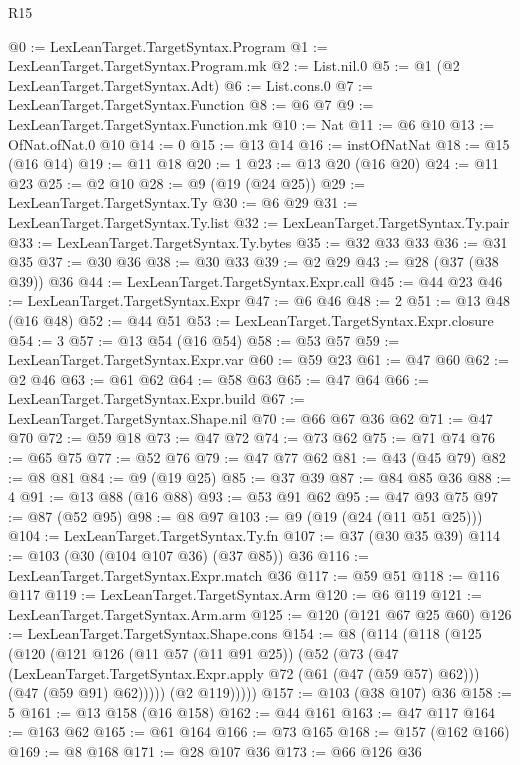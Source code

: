 \begin{lexlean}{R15}
\begin{coremodule}
@0 := LexLeanTarget.TargetSyntax.Program
@1 := LexLeanTarget.TargetSyntax.Program.mk
@2 := List.nil.{0}
@5 := @1 (@2 LexLeanTarget.TargetSyntax.Adt)
@6 := List.cons.{0}
@7 := LexLeanTarget.TargetSyntax.Function
@8 := @6 @7
@9 := LexLeanTarget.TargetSyntax.Function.mk
@10 := Nat
@11 := @6 @10
@13 := OfNat.ofNat.{0} @10
@14 := 0
@15 := @13 @14
@16 := instOfNatNat
@18 := @15 (@16 @14)
@19 := @11 @18
@20 := 1
@23 := @13 @20 (@16 @20)
@24 := @11 @23
@25 := @2 @10
@28 := @9 (@19 (@24 @25))
@29 := LexLeanTarget.TargetSyntax.Ty
@30 := @6 @29
@31 := LexLeanTarget.TargetSyntax.Ty.list
@32 := LexLeanTarget.TargetSyntax.Ty.pair
@33 := LexLeanTarget.TargetSyntax.Ty.bytes
@35 := @32 @33 @33
@36 := @31 @35
@37 := @30 @36
@38 := @30 @33
@39 := @2 @29
@43 := @28 (@37 (@38 @39)) @36
@44 := LexLeanTarget.TargetSyntax.Expr.call
@45 := @44 @23
@46 := LexLeanTarget.TargetSyntax.Expr
@47 := @6 @46
@48 := 2
@51 := @13 @48 (@16 @48)
@52 := @44 @51
@53 := LexLeanTarget.TargetSyntax.Expr.closure
@54 := 3
@57 := @13 @54 (@16 @54)
@58 := @53 @57
@59 := LexLeanTarget.TargetSyntax.Expr.var
@60 := @59 @23
@61 := @47 @60
@62 := @2 @46
@63 := @61 @62
@64 := @58 @63
@65 := @47 @64
@66 := LexLeanTarget.TargetSyntax.Expr.build
@67 := LexLeanTarget.TargetSyntax.Shape.nil
@70 := @66 @67 @36 @62
@71 := @47 @70
@72 := @59 @18
@73 := @47 @72
@74 := @73 @62
@75 := @71 @74
@76 := @65 @75
@77 := @52 @76
@79 := @47 @77 @62
@81 := @43 (@45 @79)
@82 := @8 @81
@84 := @9 (@19 @25)
@85 := @37 @39
@87 := @84 @85 @36
@88 := 4
@91 := @13 @88 (@16 @88)
@93 := @53 @91 @62
@95 := @47 @93 @75
@97 := @87 (@52 @95)
@98 := @8 @97
@103 := @9 (@19 (@24 (@11 @51 @25)))
@104 := LexLeanTarget.TargetSyntax.Ty.fn
@107 := @37 (@30 @35 @39)
@114 := @103 (@30 (@104 @107 @36) (@37 @85)) @36
@116 := LexLeanTarget.TargetSyntax.Expr.match @36
@117 := @59 @51
@118 := @116 @117
@119 := LexLeanTarget.TargetSyntax.Arm
@120 := @6 @119
@121 := LexLeanTarget.TargetSyntax.Arm.arm
@125 := @120 (@121 @67 @25 @60)
@126 := LexLeanTarget.TargetSyntax.Shape.cons
@154 := @8
    (@114
      (@118
        (@125
          (@120
            (@121
              @126
              (@11 @57 (@11 @91 @25))
              (@52
                (@73
                  (@47
                    (LexLeanTarget.TargetSyntax.Expr.apply @72 (@61 (@47 (@59 @57) @62)))
                    (@47 (@59 @91) @62)))))
            (@2 @119)))))
@157 := @103 (@38 @107) @36
@158 := 5
@161 := @13 @158 (@16 @158)
@162 := @44 @161
@163 := @47 @117
@164 := @163 @62
@165 := @61 @164
@166 := @73 @165
@168 := @157 (@162 @166)
@169 := @8 @168
@171 := @28 @107 @36
@173 := @66 @126 @36

\end{coremodule}
\end{lexlean}
